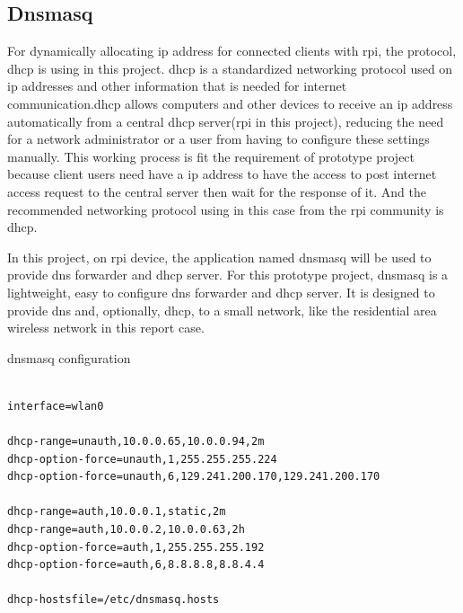 \subsection{Dnsmasq}
\par For dynamically allocating \gls{ip} address for connected clients with \gls{rpi}, the protocol, \gls{dhcp} \cite{dhcp} is using in this project. \gls{dhcp} is a standardized networking protocol used on \gls{ip} addresses and other information that is needed for internet communication.\gls{dhcp} allows computers and other devices to receive an \gls{ip} address automatically from a central \gls{dhcp} server(\gls{rpi} in this project), reducing the need for a network administrator or a user from having to configure these settings manually. This working process is fit the requirement of prototype project because client users need have a \gls{ip} address to have the access to post internet access request to the central server then wait for the response of it. And the recommended networking protocol using in this case from the \gls{rpi} community is \gls{dhcp}.
\par In this project, on \gls{rpi} device, the application named dnsmasq \cite{dnsmasq} will be used to provide \gls{dns} forwarder and \gls{dhcp} server. For this prototype project, dnsmasq is a lightweight, easy to configure \gls{dns} forwarder and \gls{dhcp} server. It is designed to provide \gls{dns} and, optionally, \gls{dhcp}, to a small network, like the residential area wireless network in this report case.

\begin{algorithm}[h]
  \caption{dnsmasq configuration}
  \label{code:dnsmasq_config}
  \begin{verbatim}
  
interface=wlan0

dhcp-range=unauth,10.0.0.65,10.0.0.94,2m
dhcp-option-force=unauth,1,255.255.255.224
dhcp-option-force=unauth,6,129.241.200.170,129.241.200.170

dhcp-range=auth,10.0.0.1,static,2m
dhcp-range=auth,10.0.0.2,10.0.0.63,2h
dhcp-option-force=auth,1,255.255.255.192
dhcp-option-force=auth,6,8.8.8.8,8.8.4.4

dhcp-hostsfile=/etc/dnsmasq.hosts
 \end{verbatim}
\end{algorithm}

